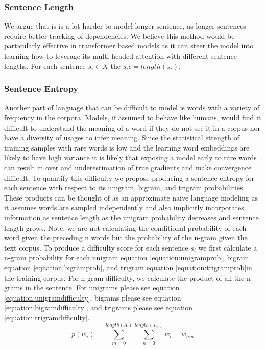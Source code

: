 \subsubsection{Sentence Length}
We argue that is is a lot harder to model longer sentence, as longer sentences require better tracking of dependencies. We believe this method would be particularly effective in transformer based models as it can steer the model into learning how to leverage its multi-headed attention with different sentence lengths. For each sentence $s_i \in X$ the  $s_i\epsilon = length(s_i)$.
\subsubsection{Sentence Entropy}
Another part of language that can be difficult to model is words with a variety of frequency in the corpora. Models, if assumed to behave like humans, would find it difficult to understand the meaning of a word if they do not see it in a corpus nor have a diversity of usages to infer meaning. Since the statistical strength of training samples with rare words is low and the learning word embeddings are likely to have high variance it is likely that exposing a model early to rare words can result in over and underestimation of true gradients and make convergence difficult. To quantify this difficulty we propose producing a sentence entropy for each sentence with respect to its unigram, bigram, and trigram probabilities. These products can be thought of as an approximate naive language modeling as it assumes words are sampled independently and also implicitly incorporates information as sentence length as the unigram probability decreases and sentence length grows. Note, we are not calculating the conditional probability of each word given the preceding n words but the probability of the n-gram given the text corpus. To produce a difficulty score for each sentence $s_i$ we first calculate a n-gram probability for each unigram equation \ref{equation:unigramprob}, bigram equation \ref{equation:bigramprob}, and trigram equation \ref{equation:trigramprob}in the training corpus. For n-gram difficulty, we calculate the product of all the n-grams in the sentence. For unigrams please see equation \ref{equation:unigramdifficulty}, bigrams please see equation \ref{equation:bigramdifficulty}, and trigrams please see equation \ref{equation:trigramdifficulty}. 
\begin{equation}
    p(w_i) = \sum_{m=0} ^ {length(X)} \sum_{n=0}^{length(s_m)} w_i = w_{nm}
\label{equation:unigramprob}
\end{equation}

